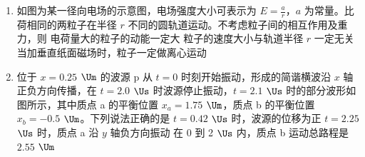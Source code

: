\documentclass[\gkver]{gaokaozhenti}
\begin{document}
\begin{enumerate}
{	故选 AB。
}

\item
如图为某一径向电场的示意图，电场强度大小可表示为 $E = \frac{a}{r}$，$a$ 为常量。比荷相同的两粒子在半径 $r$ 不同的圆轨道运动。不考虑粒子间的相互作用及重力，则
{电荷量大的粒子的动能一定大}
{粒子的速度大小与轨道半径 $r$ 一定无关}
{当加垂直纸面磁场时，粒子一定做离心运动}


\item
位于 $x = 0.25$ $\Um$ 的波源 p 从 $t = 0$ 时刻开始振动，形成的简谐横波沿 $x$ 轴正负方向传播，在 $t = 2.0$ $\Us$ 时波源停止振动，$t = 2.1$ $\Us$ 时的部分波形如图所示，其中质点 a 的平衡位置 $x_{a} = 1.75$ $\Um$，质点 b 的平衡位置 $x_{b} = -0.5$ $\Um$。下列说法正确的是
{$t = 0.42$ $\Us$ 时，波源的位移为正}
{$t = 2.25$ $\Us$ 时，质点 a 沿 $y$ 轴负方向振动}
{在 0 到 2 $\Us$ 内，质点 b 运动总路程是 $2.55$ $\Um$}


\end{enumerate}
\end{document}
